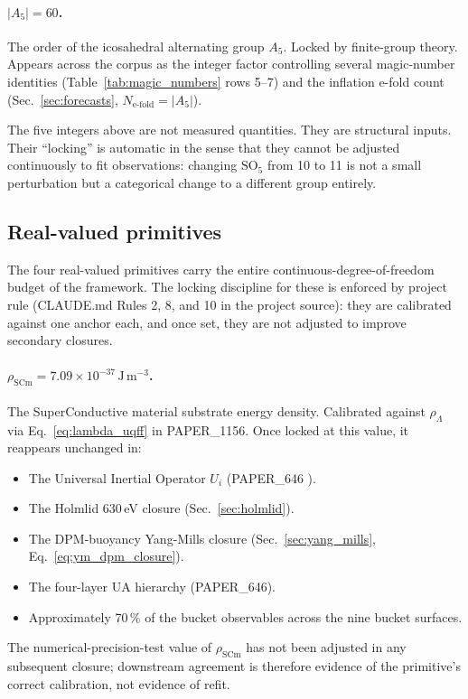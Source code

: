 \paragraph{$|A_5| = 60$.} The order of the icosahedral alternating
group $A_5$. Locked by finite-group theory. Appears across the
corpus as the integer factor controlling several magic-number
identities (Table~\ref{tab:magic_numbers} rows 5--7) and the
inflation e-fold count (Sec.~\ref{sec:forecasts}, $N_{\text{e-fold}} = |A_5|$).

The five integers above are not measured quantities. They are
structural inputs. Their ``locking'' is automatic in the sense that
they cannot be adjusted continuously to fit observations: changing
$\mathrm{SO}_5$ from 10 to 11 is not a small perturbation but a
categorical change to a different group entirely.

\subsection{Real-valued primitives}
\label{sec:real_primitives}

The four real-valued primitives carry the entire continuous-degree-of-freedom
budget of the framework. The locking discipline for these is enforced
by project rule (CLAUDE.md Rules 2, 8, and 10 in the project source):
they are calibrated against one anchor each, and once set, they are
not adjusted to improve secondary closures.

\paragraph{$\rho_{\text{SCm}} = 7.09 \times 10^{-37}\,\mathrm{J\,m^{-3}}$.}
The SuperConductive material substrate energy density.
Calibrated against $\rho_\Lambda$ via Eq.~\ref{eq:lambda_uqff} in
PAPER\_1156. Once locked at this value, it reappears unchanged in:
\begin{itemize}
  \item The Universal Inertial Operator $U_i$ (PAPER\_646
        \cite{Murphy_PAPER_646}).
  \item The Holmlid 630\,eV closure (Sec.~\ref{sec:holmlid}).
  \item The DPM-buoyancy Yang-Mills closure
        (Sec.~\ref{sec:yang_mills}, Eq.~\ref{eq:ym_dpm_closure}).
  \item The four-layer UA hierarchy (PAPER\_646).
  \item Approximately 70\,\% of the bucket observables across the
        nine bucket surfaces.
\end{itemize}
The numerical-precision-test value of $\rho_{\text{SCm}}$ has not
been adjusted in any subsequent closure; downstream agreement is
therefore evidence of the primitive's correct calibration, not
evidence of refit.


